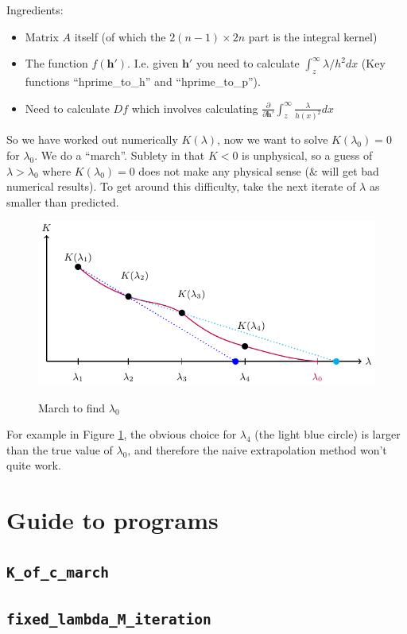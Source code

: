 \documentclass{article}
\newcommand{\bs}{\boldsymbol}                               %
\begin{document}
Ingredients:
\begin{itemize}
\item Matrix $A$ itself (of which the $2(n-1)\times2n$ part is the integral
      kernel)
\item The function $f(\bs{h}')$. I.e. given $\bs{h}'$ you need to calculate
      $\int_z^{\infty}\lambda/h^2 dx$ (Key functions ``hprime\_to\_h'' and
      ``hprime\_to\_p'').
\item Need to calculate $Df$ which involves calculating $\displaystyle \frac
      {\partial} {\partial \bs{h}'} \int_z^{\infty} \frac{\lambda}{h(x)^2}dx$

\end{itemize}
So we have worked out numerically $K(\lambda)$, now we want to solve 
$K(\lambda_0)=0$ for $\lambda_0$. We do a ``march''. Sublety in that $K<0$ is 
unphysical, so a guess of $\lambda>\lambda_0$ where $K(\lambda_0)=0$ does
not make any physical sense (\& will get bad numerical results). To get 
around this difficulty, take the next iterate of $\lambda$ as smaller than
predicted.
\begin{figure}[!ht]\centering
\caption{March to find $\lambda_0$}
\includegraphics{NumFig1.pdf}\label{March}
\end{figure}

For example in Figure \ref{March}, the obvious choice for $\lambda_4$
(the light blue circle) is larger than the true value of $\lambda_0$, 
and therefore the naive extrapolation method won't quite work.
\clearpage
\section*{Guide to programs}
\subsection*{\color{blue} \texttt{K\_of\_c\_march}}

\subsection*{\color{blue} \texttt{fixed\_lambda\_M\_iteration}}

\end{document}
